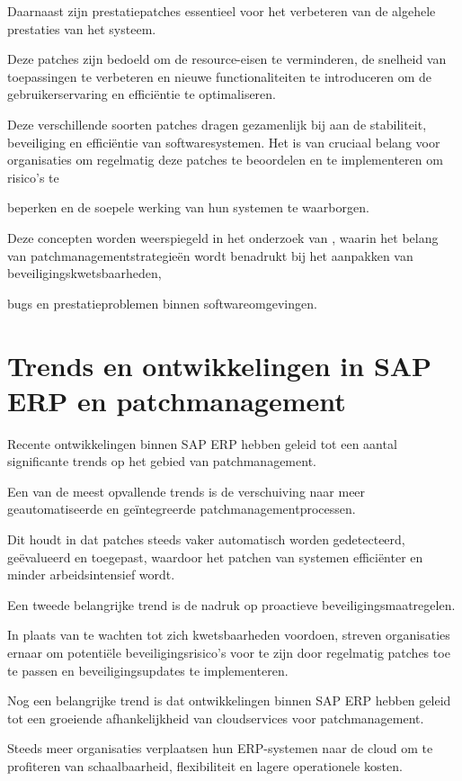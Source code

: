 Daarnaast zijn prestatiepatches essentieel voor het verbeteren van de algehele prestaties van het systeem.

Deze patches zijn bedoeld om de resource-eisen te verminderen, de snelheid van toepassingen te verbeteren en nieuwe functionaliteiten te introduceren om de gebruikerservaring en efficiëntie te optimaliseren.

Deze verschillende soorten patches dragen gezamenlijk bij aan de stabiliteit, beveiliging en efficiëntie van softwaresystemen. Het is van cruciaal belang voor organisaties om regelmatig deze patches te beoordelen en te implementeren om risico's te 

beperken en de soepele werking van hun systemen te waarborgen.

Deze concepten worden weerspiegeld in het onderzoek van \textcite{Wrobel2023}, waarin het belang van patchmanagementstrategieën wordt benadrukt bij het aanpakken van beveiligingskwetsbaarheden,

bugs en prestatieproblemen binnen softwareomgevingen.

\section{Trends en ontwikkelingen in SAP ERP en patchmanagement}
Recente ontwikkelingen binnen SAP ERP hebben geleid tot een aantal significante trends op het gebied van patchmanagement.

Een van de meest opvallende trends is de verschuiving naar meer geautomatiseerde en geïntegreerde patchmanagementprocessen.

Dit houdt in dat patches steeds vaker automatisch worden gedetecteerd, geëvalueerd en toegepast, waardoor het patchen van systemen efficiënter en minder arbeidsintensief wordt.

Een tweede belangrijke trend is de nadruk op proactieve beveiligingsmaatregelen.

In plaats van te wachten tot zich kwetsbaarheden voordoen, streven organisaties ernaar om potentiële beveiligingsrisico's voor te zijn door regelmatig patches toe te passen en beveiligingsupdates te implementeren.

Nog een belangrijke trend is dat ontwikkelingen binnen SAP ERP hebben geleid tot een groeiende afhankelijkheid van cloudservices voor patchmanagement.

Steeds meer organisaties verplaatsen hun ERP-systemen naar de cloud om te profiteren van schaalbaarheid, flexibiliteit en lagere operationele kosten.

